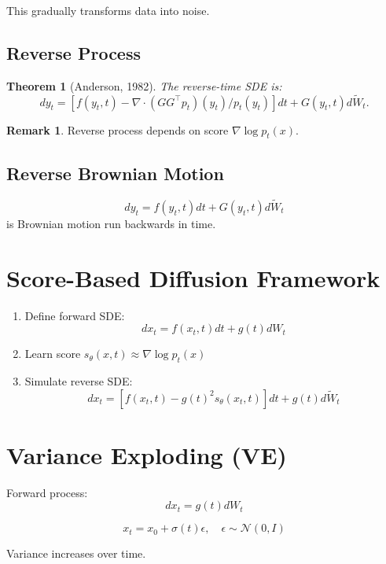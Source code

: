 \documentclass[12pt,oneside]{book}
\numberwithin{equation}{section}
\theoremstyle{definition}
\newtheorem{remark}{Remark}[section]
\theoremstyle{plain}
\newtheorem{theorem}{Theorem}[section]
\theoremstyle{remark}
\newcommand{\Normal}{\mathcal{N}}
\begin{document}
This gradually transforms data into noise.

\subsection{Reverse Process}

\begin{theorem}[Anderson, 1982]
The reverse-time SDE is:
\[
dy_t =
\left[
f(y_t,t) - \nabla \cdot (G G^\top p_t)(y_t) / p_t(y_t)
\right] dt
+
G(y_t,t) d\widetilde{W}_t.
\]
\end{theorem}

\begin{remark}
Reverse process depends on score $\nabla \log p_t(x)$.
\end{remark}

\subsection{Reverse Brownian Motion}

\[
dy_t = f(y_t,t) dt + G(y_t,t) d\widetilde{W}_t
\]
is Brownian motion run backwards in time.

\section{Score-Based Diffusion Framework}

\begin{enumerate}
    \item Define forward SDE:
    \[
    dx_t = f(x_t,t) dt + g(t) dW_t
    \]
    
    \item Learn score $s_\theta(x,t) \approx \nabla \log p_t(x)$
    
    \item Simulate reverse SDE:
    \[
    dx_t =
    \left[
    f(x_t,t) - g(t)^2 s_\theta(x_t,t)
    \right] dt
    +
    g(t) d\widetilde{W}_t
    \]
\end{enumerate}

\section{Variance Exploding (VE)}

Forward process:
\[
dx_t = g(t) dW_t
\]

\[
x_t = x_0 + \sigma(t)\epsilon, \quad \epsilon \sim \Normal(0,I)
\]

Variance increases over time.
\end{document}
